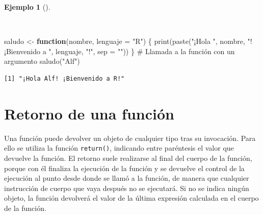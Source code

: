 \documentclass[
  a4paper,
]{scrreport}
\newenvironment{Shaded}{\begin{snugshade}}{\end{snugshade}}
\newcommand{\AttributeTok}[1]{\textcolor[rgb]{0.40,0.45,0.13}{#1}}
\newcommand{\CommentTok}[1]{\textcolor[rgb]{0.37,0.37,0.37}{#1}}
\newcommand{\ControlFlowTok}[1]{\textcolor[rgb]{0.00,0.23,0.31}{\textbf{#1}}}
\newcommand{\FunctionTok}[1]{\textcolor[rgb]{0.28,0.35,0.67}{#1}}
\newcommand{\NormalTok}[1]{\textcolor[rgb]{0.00,0.23,0.31}{#1}}
\newcommand{\OtherTok}[1]{\textcolor[rgb]{0.00,0.23,0.31}{#1}}
\newcommand{\StringTok}[1]{\textcolor[rgb]{0.13,0.47,0.30}{#1}}
\theoremstyle{definition}
\theoremstyle{definition}
\newtheorem{example}{Ejemplo}[chapter]
\theoremstyle{remark}
\begin{document}
\begin{example}[]\protect\hypertarget{exm-argumento-defecto-funcion}{}\label{exm-argumento-defecto-funcion}

~

\begin{Shaded}
\begin{Highlighting}[]
\NormalTok{saludo }\OtherTok{\textless{}{-}} \ControlFlowTok{function}\NormalTok{(nombre, }\AttributeTok{lenguaje =} \StringTok{"R"}\NormalTok{) \{}
  \FunctionTok{print}\NormalTok{(}\FunctionTok{paste}\NormalTok{(}\StringTok{"¡Hola "}\NormalTok{, nombre, }\StringTok{"! ¡Bienvenido a "}\NormalTok{, lenguaje, }\StringTok{"!"}\NormalTok{, }\AttributeTok{sep =} \StringTok{""}\NormalTok{))}
\NormalTok{\}}
\CommentTok{\# Llamada a la función con un argumento}
\FunctionTok{saludo}\NormalTok{(}\StringTok{"Alf"}\NormalTok{)}
\end{Highlighting}
\end{Shaded}

\begin{verbatim}
[1] "¡Hola Alf! ¡Bienvenido a R!"
\end{verbatim}

\end{example}

\section{Retorno de una función}\label{retorno-de-una-funciuxf3n}

Una función puede devolver un objeto de cualquier tipo tras su
invocación. Para ello se utiliza la función \texttt{return()}, indicando
entre paréntesis el valor que devuelve la función. El retorno suele
realizarse al final del cuerpo de la función, porque con él finaliza la
ejecución de la función y se devuelve el control de la ejecución al
punto desde donde se llamó a la función, de manera que cualquier
instrucción de cuerpo que vaya después no se ejecutará. Si no se indica
ningún objeto, la función devolverá el valor de la última expresión
calculada en el cuerpo de la función.
\end{document}
